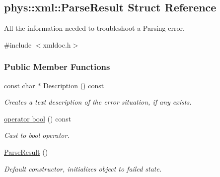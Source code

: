 \hypertarget{structphys_1_1xml_1_1ParseResult}{
\subsection{phys::xml::ParseResult Struct Reference}
\label{structphys_1_1xml_1_1ParseResult}
}


All the information needed to troubleshoot a Parsing error.  




{\ttfamily \#include $<$xmldoc.h$>$}

\subsubsection*{Public Member Functions}
\begin{DoxyCompactItemize}
\item 
const char $\ast$ \hyperlink{structphys_1_1xml_1_1ParseResult_a7f31e89fbe1735e5092adfc352ae5a0d}{Description} () const 
\begin{DoxyCompactList}\small\item\em Creates a text description of the error situation, if any exists. \item\end{DoxyCompactList}\item 
\hyperlink{structphys_1_1xml_1_1ParseResult_a95c9989865c1bace7846995166a13e31}{operator bool} () const 
\begin{DoxyCompactList}\small\item\em Cast to bool operator. \item\end{DoxyCompactList}\item 
\hypertarget{structphys_1_1xml_1_1ParseResult_aa7520df050e866122a0cf67bf306e323}{
\hyperlink{structphys_1_1xml_1_1ParseResult_aa7520df050e866122a0cf67bf306e323}{ParseResult} ()}
\label{structphys_1_1xml_1_1ParseResult_aa7520df050e866122a0cf67bf306e323}

\begin{DoxyCompactList}\small\item\em Default constructor, initializes object to failed state. \item\end{DoxyCompactList}\end{DoxyCompactItemize}
